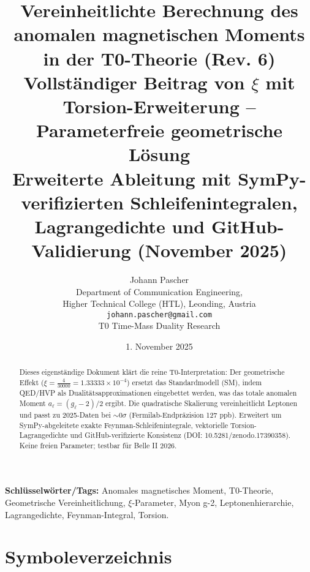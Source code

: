 \documentclass[12pt,a4paper]{article}
\title{\textbf{Vereinheitlichte Berechnung des anomalen magnetischen Moments in der T0-Theorie (Rev. 6)}\\[0.5cm]
	\large Vollständiger Beitrag von $\xi$ mit Torsion-Erweiterung -- Parameterfreie geometrische Lösung\\[0.3cm]
	\normalsize Erweiterte Ableitung mit SymPy-verifizierten Schleifenintegralen, Lagrangedichte und GitHub-Validierung (November 2025)}
\author{Johann Pascher\\
	\small Department of Communication Engineering,\\
	\small Higher Technical College (HTL), Leonding, Austria\\
	\small \texttt{johann.pascher@gmail.com}\\
	\small T0 Time-Mass Duality Research}
\date{1. November 2025}
\begin{document}
	
	\maketitle
	\thispagestyle{fancy}
	
	\begin{abstract}
		Dieses eigenständige Dokument klärt die reine T0-Interpretation: Der geometrische Effekt ($\xi = \frac{4}{30000} = 1.33333 \times 10^{-4}$) ersetzt das Standardmodell (SM), indem QED/HVP als Dualitätsapproximationen eingebettet werden, was das totale anomalen Moment $a_\ell = (g_\ell - 2)/2$ ergibt. Die quadratische Skalierung vereinheitlicht Leptonen und passt zu 2025-Daten bei $\sim 0\sigma$ (Fermilab-Endpräzision 127 ppb). Erweitert um SymPy-abgeleitete exakte Feynman-Schleifenintegrale, vektorielle Torsion-Lagrangedichte und GitHub-verifizierte Konsistenz (DOI: 10.5281/zenodo.17390358). Keine freien Parameter; testbar für Belle II 2026.
	\end{abstract}
	
	\textbf{Schlüsselwörter/Tags:} Anomales magnetisches Moment, T0-Theorie, Geometrische Vereinheitlichung, $\xi$-Parameter, Myon g-2, Leptonenhierarchie, Lagrangedichte, Feynman-Integral, Torsion.
	
	\tableofcontents
	
	\section*{Symboleverzeichnis}
	
\end{document}
